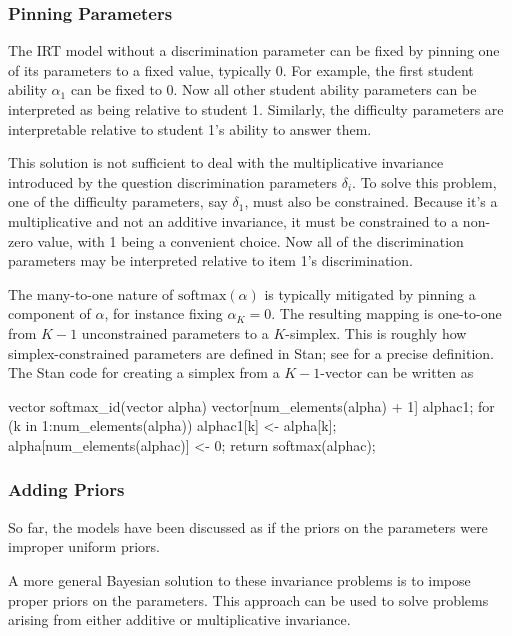 \subsubsection{Pinning Parameters}

The IRT model without a discrimination parameter can be fixed by
pinning one of its parameters to a fixed value, typically 0.  For
example, the first student ability $\alpha_1$ can be fixed to 0.  Now
all other student ability parameters can be interpreted as being
relative to student 1.  Similarly, the difficulty parameters are
interpretable relative to student 1's ability to answer them.

This solution is not sufficient to deal with the multiplicative
invariance introduced by the question discrimination parameters
$\delta_i$.  To solve this problem, one of the difficulty parameters,
say $\delta_1$, must also be constrained.  Because it's a
multiplicative and not an additive invariance, it must be constrained
to a non-zero value, with 1 being a convenient choice.  Now all of the
discrimination parameters may be interpreted relative to item 1's
discrimination.

The many-to-one nature of $\mbox{softmax}(\alpha)$ is typically
mitigated by pinning a component of $\alpha$, for instance fixing
$\alpha_K = 0$.  The resulting mapping is one-to-one from $K-1$
unconstrained parameters to a $K$-simplex.  This is roughly how
simplex-constrained parameters are defined in Stan; see
 for a precise definition.  The Stan
code for creating a simplex from a $K-1$-vector can be written as
%
\begin{stancode}
vector softmax_id(vector alpha) {
  vector[num_elements(alpha) + 1] alphac1;
  for (k in 1:num_elements(alpha))
    alphac1[k] <- alpha[k];
  alpha[num_elements(alphac)] <- 0;
  return softmax(alphac);
}
\end{stancode}




\subsubsection{Adding Priors}

So far, the models have been discussed as if the priors on the
parameters were improper uniform priors.  

A more general Bayesian solution to these invariance problems is to
impose proper priors on the parameters.  This approach can be used to
solve problems arising from either additive or multiplicative
invariance.

